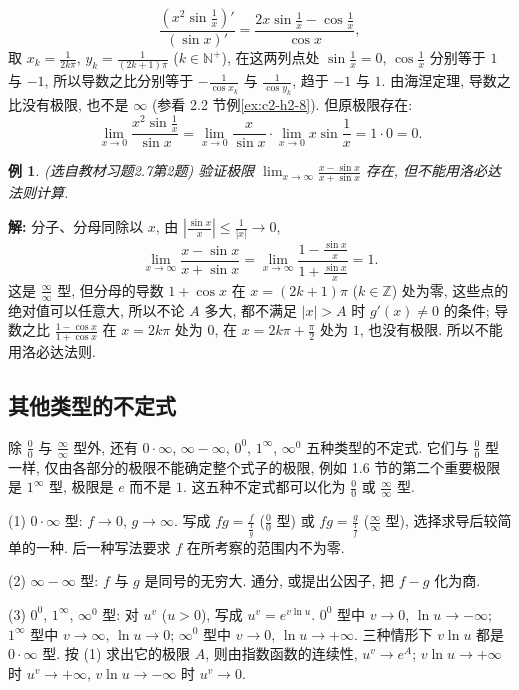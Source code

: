 \documentclass[UTF8,openany]{ctexbook}
\theoremstyle{chinesetextbook}
\newtheorem{example}{例}[section]
\newenvironment{cnsolution}{\par\indent\textbf{解:} \ignorespaces}{\par}
\begin{document}
\[
\frac{\left(x^2\sin\frac1x\right)'}{(\sin x)'}=\frac{2x\sin\frac1x-\cos\frac1x}{\cos x},
\]
取 $\displaystyle x_k=\frac1{2k\pi}$, $\displaystyle y_k=\frac1{(2k+1)\pi}$ ($k\in\mathbb N^+$), 在这两列点处 $\displaystyle\sin\frac1x=0$, $\displaystyle\cos\frac1x$ 分别等于 $1$ 与 $-1$, 所以导数之比分别等于 $\displaystyle-\frac1{\cos x_k}$ 与 $\displaystyle\frac1{\cos y_k}$, 趋于 $-1$ 与 $1$. 由海涅定理, 导数之比没有极限, 也不是 $\infty$ (参看 2.2 节例\ref{ex:c2-h2-8}). 但原极限存在:
\[
\lim_{x\to0}\frac{x^2\sin\frac1x}{\sin x}=\lim_{x\to0}\frac x{\sin x}\cdot\lim_{x\to0}x\sin\frac1x=1\cdot0=0.
\]
\begin{example}\label{ex:c2-h7-2}
\textnormal{(选自教材习题2.7第2题)} 验证极限 $\displaystyle\lim_{x\to\infty}\frac{x-\sin x}{x+\sin x}$ 存在, 但不能用洛必达法则计算.
\end{example}
\begin{cnsolution}
分子、分母同除以 $x$, 由 $\displaystyle\left|\frac{\sin x}x\right|\le\frac1{|x|}\to0$,
\[
\lim_{x\to\infty}\frac{x-\sin x}{x+\sin x}=\lim_{x\to\infty}\frac{1-\frac{\sin x}x}{1+\frac{\sin x}x}=1.
\]
这是 $\displaystyle\frac\infty\infty$ 型, 但分母的导数 $1+\cos x$ 在 $x=(2k+1)\pi$ ($k\in\mathbb Z$) 处为零, 这些点的绝对值可以任意大, 所以不论 $A$ 多大, 都不满足 $|x|>A$ 时 $g'(x)\ne0$ 的条件; 导数之比 $\displaystyle\frac{1-\cos x}{1+\cos x}$ 在 $x=2k\pi$ 处为 $0$, 在 $\displaystyle x=2k\pi+\frac\pi2$ 处为 $1$, 也没有极限. 所以不能用洛必达法则.
\end{cnsolution}
\subsection{其他类型的不定式}
除 $\displaystyle\frac00$ 与 $\displaystyle\frac\infty\infty$ 型外, 还有 $0\cdot\infty$, $\infty-\infty$, $0^0$, $1^\infty$, $\infty^0$ 五种类型的不定式. 它们与 $\displaystyle\frac00$ 型一样, 仅由各部分的极限不能确定整个式子的极限, 例如 1.6 节的第二个重要极限是 $1^\infty$ 型, 极限是 $e$ 而不是 $1$. 这五种不定式都可以化为 $\displaystyle\frac00$ 或 $\displaystyle\frac\infty\infty$ 型.

(1) $0\cdot\infty$ 型: $f\to0$, $g\to\infty$. 写成 $\displaystyle fg=\frac f{\frac1g}$ ($\displaystyle\frac00$ 型) 或 $\displaystyle fg=\frac g{\frac1f}$ ($\displaystyle\frac\infty\infty$ 型), 选择求导后较简单的一种. 后一种写法要求 $f$ 在所考察的范围内不为零.

(2) $\infty-\infty$ 型: $f$ 与 $g$ 是同号的无穷大. 通分, 或提出公因子, 把 $f-g$ 化为商.

(3) $0^0$, $1^\infty$, $\infty^0$ 型: 对 $u^v$ ($u>0$), 写成 $u^v=e^{v\ln u}$. $0^0$ 型中 $v\to0$, $\ln u\to-\infty$; $1^\infty$ 型中 $v\to\infty$, $\ln u\to0$; $\infty^0$ 型中 $v\to0$, $\ln u\to+\infty$. 三种情形下 $v\ln u$ 都是 $0\cdot\infty$ 型. 按 (1) 求出它的极限 $A$, 则由指数函数的连续性, $u^v\to e^A$; $v\ln u\to+\infty$ 时 $u^v\to+\infty$, $v\ln u\to-\infty$ 时 $u^v\to0$.
\end{document}
